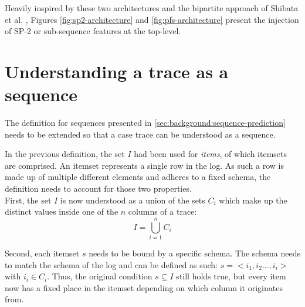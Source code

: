 Heavily inspired by these two architectures and the bipartite approach of Shibata et al. \cite{shibata2016bipartite}, Figures \ref{fig:sp2-architecture} and \ref{fig:pfs-architecture} present the injection of SP-2 or sub-sequence features at the top-level.

\section{Understanding a trace as a sequence}
The definition for sequences presented in \autoref{sec:background:sequence-prediction} needs to be extended so that a case trace can be understood as a sequence.

In the previous definition, the set $I$ had been used for \textit{items}, of which itemsets are comprised. An itemset represents a single row in the log. As such a row is made up of multiple different elements and adheres to a fixed schema, the definition needs to account for those two properties.\\

First, the set $I$ is now understood as a union of the sets $C_i$ which make up the distinct values inside one of the $n$ columns of a trace:
$$I = \bigcup\limits_{i=1}^{n} C_{i}$$

Second, each itemset $s$ needs to be bound by a specific schema. The schema needs to match the schema of the log and can be defined as such: $s = <i_1, i_2 ..., i_i>$ with $i_i \in C_i$. Thus, the original condition $s \subseteq I$ still holds true, but every item now has a fixed place in the itemset depending on which column it originates from.